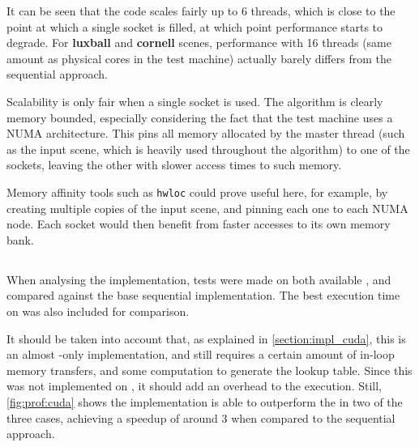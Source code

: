 \documentclass[main.tex]{subfiles}
\begin{document}
It can be seen that the code scales fairly up to 6 threads, which is close to the point at which a single \cpu socket is filled, at which point performance starts to degrade.
For \textbf{luxball} and \textbf{cornell} scenes, performance with 16 threads (same amount as physical \cpu cores in the test machine) actually barely differs from the sequential approach.

Scalability is only fair when a single socket is used. The algorithm is clearly memory bounded, especially considering the fact that the test machine uses a \acs{NUMA} architecture. This pins all memory allocated by the master thread (such as the input scene, which is heavily used throughout the algorithm) to one of the sockets, leaving the other with slower access times to such memory.

Memory affinity tools such as \texttt{hwloc} could prove useful here, for example, by creating multiple copies of the input scene, and pinning each one to each \acs{NUMA} node. Each socket would then benefit from faster accesses to its own memory bank.

\subsection{\gpu}

When analysing the \gpu implementation, tests were made on both available \gpus, and compared against the base sequential \cpu implementation. The best execution time on \cpu was also included for comparison.

It should be taken into account that, as explained in \cref{section:impl_cuda}, this is an almost \gpu-only implementation, and still requires a certain amount of in-loop memory transfers, and some \cpu computation to generate the lookup table. Since this was not implemented on \gpu, it should add an overhead to the execution. Still, \cref{fig:prof:cuda} shows the implementation is able to outperform the \cpu in two of the three cases, achieving a speedup of around 3 when compared to the sequential approach.
\end{document}
